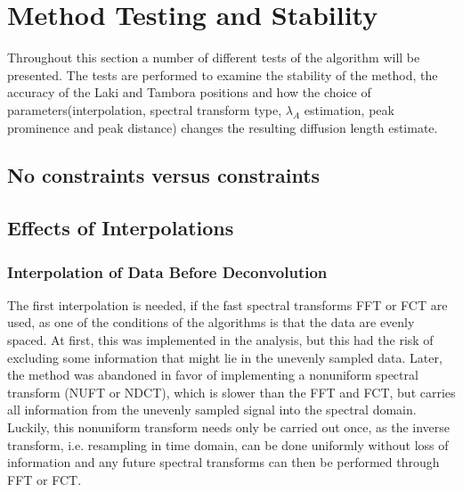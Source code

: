 \documentclass[../../CompleteThesis2/Complete_2ndDraft]{subfiles}
\begin{document}



\section[Testing and Stability][Testing and Stability]{Method Testing and Stability}
\label{Sec:Method_TestStab}

Throughout this section a number of different tests of the algorithm will be presented. The tests are performed to examine the stability of the method, the accuracy of the Laki and Tambora positions and how the choice of parameters(interpolation, spectral transform type, $\lambda_A$ estimation, peak prominence and peak distance) changes the resulting diffusion length estimate. 

\subsection[Constraints or No Constraints]{No constraints versus constraints}
\label{Subsec:Method_TestStab_ConstNoConst}


\subsection[Effects of Interpolations]{Effects of Interpolations}
\label{Subsec:METH_Interpolation}
\subsubsection[Interpolation 1]{Interpolation of Data Before Deconvolution}
\label{Subsubsec:METH_Interpolation_BFdecon}

The first interpolation is needed, if the fast spectral transforms FFT or FCT are used, as one of the conditions of the algorithms is that the data are evenly spaced. At first, this was implemented in the analysis, but this had the risk of excluding some information that might lie in the unevenly sampled data. Later, the method was abandoned in favor of implementing a nonuniform spectral transform (NUFT or NDCT), which is slower than the FFT and FCT, but carries all information from the unevenly sampled signal into the spectral domain. Luckily, this nonuniform transform needs only be carried out once, as the inverse transform, i.e. resampling in time domain, can be done uniformly without loss of information and any future spectral transforms can then be performed through FFT or FCT.
\end{document}
